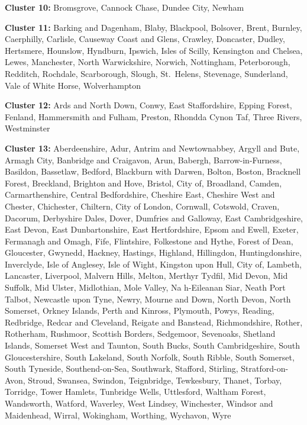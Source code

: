 \documentclass[Royal,times,sageh]{sagej}
\begin{document}
\textbf{Cluster 10: } Bromsgrove, Cannock Chase, Dundee City, Newham

\textbf{Cluster 11: } Barking and Dagenham, Blaby, Blackpool, Bolsover,
Brent, Burnley, Caerphilly, Carlisle, Causeway Coast and Glens, Crawley,
Doncaster, Dudley, Hertsmere, Hounslow, Hyndburn, Ipswich, Isles of
Scilly, Kensington and Chelsea, Lewes, Manchester, North Warwickshire,
Norwich, Nottingham, Peterborough, Redditch, Rochdale, Scarborough,
Slough, St.~Helens, Stevenage, Sunderland, Vale of White Horse,
Wolverhampton

\textbf{Cluster 12: } Ards and North Down, Conwy, East Staffordshire,
Epping Forest, Fenland, Hammersmith and Fulham, Preston, Rhondda Cynon
Taf, Three Rivers, Westminster

\textbf{Cluster 13: } Aberdeenshire, Adur, Antrim and Newtownabbey,
Argyll and Bute, Armagh City, Banbridge and Craigavon, Arun, Babergh,
Barrow-in-Furness, Basildon, Bassetlaw, Bedford, Blackburn with Darwen,
Bolton, Boston, Bracknell Forest, Breckland, Brighton and Hove, Bristol,
City of, Broadland, Camden, Carmarthenshire, Central Bedfordshire,
Cheshire East, Cheshire West and Chester, Chichester, Chiltern, City of
London, Cornwall, Cotswold, Craven, Dacorum, Derbyshire Dales, Dover,
Dumfries and Galloway, East Cambridgeshire, East Devon, East
Dunbartonshire, East Hertfordshire, Epsom and Ewell, Exeter, Fermanagh
and Omagh, Fife, Flintshire, Folkestone and Hythe, Forest of Dean,
Gloucester, Gwynedd, Hackney, Hastings, Highland, Hillingdon,
Huntingdonshire, Inverclyde, Isle of Anglesey, Isle of Wight, Kingston
upon Hull, City of, Lambeth, Lancaster, Liverpool, Malvern Hills,
Melton, Merthyr Tydfil, Mid Devon, Mid Suffolk, Mid Ulster, Midlothian,
Mole Valley, Na h-Eileanan Siar, Neath Port Talbot, Newcastle upon Tyne,
Newry, Mourne and Down, North Devon, North Somerset, Orkney Islands,
Perth and Kinross, Plymouth, Powys, Reading, Redbridge, Redcar and
Cleveland, Reigate and Banstead, Richmondshire, Rother, Rotherham,
Rushmoor, Scottish Borders, Sedgemoor, Sevenoaks, Shetland Islands,
Somerset West and Taunton, South Bucks, South Cambridgeshire, South
Gloucestershire, South Lakeland, South Norfolk, South Ribble, South
Somerset, South Tyneside, Southend-on-Sea, Southwark, Stafford,
Stirling, Stratford-on-Avon, Stroud, Swansea, Swindon, Teignbridge,
Tewkesbury, Thanet, Torbay, Torridge, Tower Hamlets, Tunbridge Wells,
Uttlesford, Waltham Forest, Wandsworth, Watford, Waverley, West Lindsey,
Winchester, Windsor and Maidenhead, Wirral, Wokingham, Worthing,
Wychavon, Wyre
\end{document}
